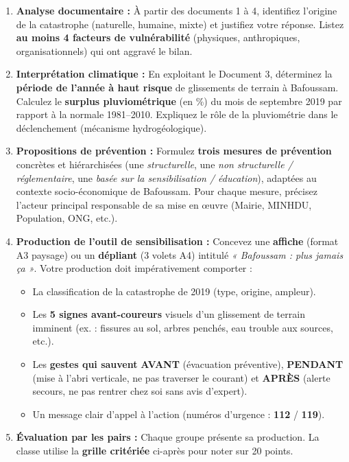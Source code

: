 \documentclass[11pt]{article}
\newcommand{\cle}[1]{{\popxbold\color{popdark}#1}}
\begin{document}
\begin{enumerate}
    \item \textbf{Analyse documentaire :} À partir des documents 1 à 4, identifiez l'\cle{origine} de la catastrophe (naturelle, humaine, mixte) et justifiez votre réponse. Listez \textbf{au moins 4 facteurs de vulnérabilité} (physiques, anthropiques, organisationnels) qui ont aggravé le bilan.
    \item \textbf{Interprétation climatique :} En exploitant le Document 3, déterminez la \textbf{période de l'année à haut risque} de glissements de terrain à Bafoussam. Calculez le \textbf{surplus pluviométrique} (en \%) du mois de septembre 2019 par rapport à la normale 1981--2010. Expliquez le rôle de la pluviométrie dans le déclenchement (mécanisme hydrogéologique).
    \item \textbf{Propositions de prévention :} Formulez \textbf{trois mesures de prévention} concrètes et hiérarchisées (une \emph{structurelle}, une \emph{non structurelle / réglementaire}, une \emph{basée sur la sensibilisation / éducation}), adaptées au contexte socio-économique de Bafoussam. Pour chaque mesure, précisez l'acteur principal responsable de sa mise en œuvre (Mairie, MINHDU, Population, ONG, etc.).
    \item \textbf{Production de l'outil de sensibilisation :} Concevez une \textbf{affiche} (format A3 paysage) ou un \textbf{dépliant} (3 volets A4) intitulé \emph{« Bafoussam : plus jamais ça »}. Votre production doit impérativement comporter :
    \begin{itemize}
        \item La \cle{classification} de la catastrophe de 2019 (type, origine, ampleur).
        \item Les \textbf{5 signes avant-coureurs} visuels d'un glissement de terrain imminent (ex. : fissures au sol, arbres penchés, eau trouble aux sources, etc.).
        \item Les \textbf{gestes qui sauvent} \textbf{AVANT} (évacuation préventive), \textbf{PENDANT} (mise à l'abri verticale, ne pas traverser le courant) et \textbf{APRÈS} (alerte secours, ne pas rentrer chez soi sans avis d'expert).
        \item Un message clair d'appel à l'action (numéros d'urgence : \textbf{112} / \textbf{119}).
    \end{itemize}
    \item \textbf{Évaluation par les pairs :} Chaque groupe présente sa production. La classe utilise la \textbf{grille critériée} ci-après pour noter sur 20 points.
\end{enumerate}
\end{document}
